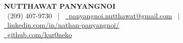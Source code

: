 \documentclass[letterpaper,11pt]{article}
\begin{document}
\vspace{-10pt}
\begin{center}
    {\Large \textbf{NUTTHAWAT PANYANGNOI}} \vspace{1pt} \\
    \small 
    \faPhone\ (209) 407-9730 ~|~
    \href{mailto:panyangnoi.nutthawat@gmail.com}{\faEnvelope\ panyangnoi.nutthawat@gmail.com} ~|~
    \href{https://www.linkedin.com/in/nathan-panyangnoi/}{\faLinkedin\ linkedin.com/in/nathan-panyangnoi/} \\
    \href{https://github.com/kur0neko}{\faGithub\ github.com/kur0neko}
\end{center}

\end{document}
